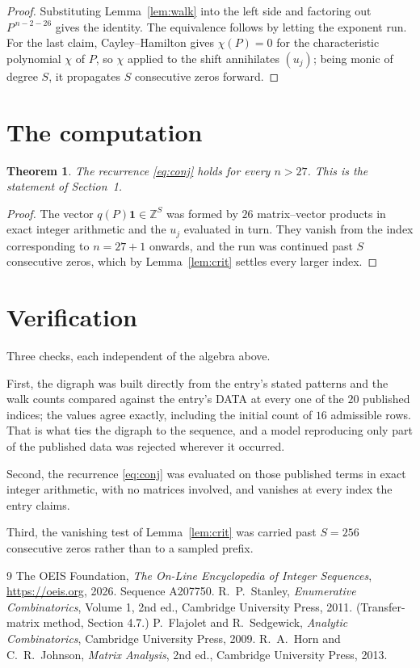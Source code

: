 \documentclass[11pt,a4paper]{article}
\theoremstyle{plain}
\newtheorem{theorem}{Theorem}
\theoremstyle{definition}
\begin{document}
\begin{proof}
Substituting Lemma~\ref{lem:walk} into the left side and factoring out
$P^{\,n-2-26}$ gives the identity. The equivalence follows by letting the exponent
run. For the last claim, Cayley--Hamilton gives $\chi(P)=0$ for the characteristic
polynomial $\chi$ of $P$, so $\chi$ applied to the shift annihilates $(u_j)$; being monic of
degree $S$, it propagates $S$ consecutive zeros forward.
\end{proof}

\section{The computation}

\begin{theorem}
The recurrence \eqref{eq:conj} holds for every $n>27$. This is the statement of
Section~1.
\end{theorem}

\begin{proof}
The vector $q(P)\mathbf{1}\in\mathbb{Z}^{S}$ was formed by $26$ matrix--vector
products in exact integer arithmetic and the $u_j$ evaluated in turn. They vanish from the
index corresponding to $n=27+1$ onwards, and the run was continued past $S$ consecutive
zeros, which by Lemma~\ref{lem:crit} settles every larger index.
\end{proof}

\section{Verification}

Three checks, each independent of the algebra above.

First, the digraph was built directly from the entry's stated patterns and the walk counts
compared against the entry's DATA at every one of the $20$ published indices; the
values agree exactly, including the initial count of $16$ admissible rows. That is
what ties the digraph to the sequence, and a model reproducing only part of the published
data was rejected wherever it occurred.

Second, the recurrence \eqref{eq:conj} was evaluated on those published terms in exact
integer arithmetic, with no matrices involved, and vanishes at every index the entry claims.

Third, the vanishing test of Lemma~\ref{lem:crit} was carried past $S=256$ consecutive
zeros rather than to a sampled prefix.

\begin{thebibliography}{9}
 The OEIS Foundation, \emph{The On-Line Encyclopedia of Integer
Sequences}, \url{https://oeis.org}, 2026. Sequence A207750.
 R.~P.~Stanley, \emph{Enumerative Combinatorics}, Volume 1, 2nd ed.,
Cambridge University Press, 2011. (Transfer-matrix method, Section 4.7.)
 P.~Flajolet and R.~Sedgewick, \emph{Analytic Combinatorics}, Cambridge
University Press, 2009.
 R.~A.~Horn and C.~R.~Johnson, \emph{Matrix Analysis}, 2nd ed., Cambridge
University Press, 2013.
\end{thebibliography}
\end{document}
